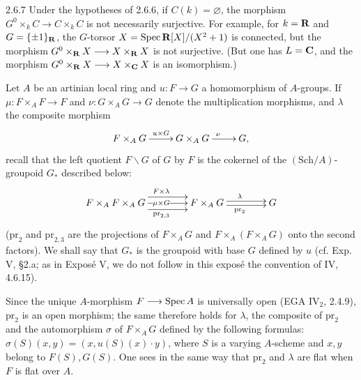 \begin{remark}{2.6.7}\label{VIA.2.6.7}
Under the hypotheses of 2.6.6, if $C(k)=\varnothing$, the morphism $G^0\times_kC\to C\times_kC$ is not necessarily surjective. For example, for $k=\mathbf{R}$ and $G=\{\pm1\}_{\mathbf{R}}$, the $G$-torsor $X=\operatorname{Spec}\mathbf{R}[X]/(X^2+1)$ is connected, but the morphism $G^0\times_{\mathbf{R}}X\longrightarrow X\times_{\mathbf{R}}X$ is not surjective. (But one has $L=\mathbf{C}$, and the morphism $G^0\times_{\mathbf{R}}X\longrightarrow X\times_{\mathbf{C}}X$ is an isomorphism.)
\end{remark}

Let $A$ be an artinian local ring and $u:F\to G$ a homomorphism of $A$-groups. If $\mu:F\times_AF\to F$ and $\nu:G\times_AG\to G$ denote the multiplication morphisms, and $\lambda$ the composite morphism
\[
\xymatrix{F\times_AG\ar[r]^{u\times G}&G\times_AG\ar[r]^\nu&G,}
\]
recall that the left quotient $F\backslash G$ of $G$ by $F$ is the cokernel of the $(\mathrm{Sch}/A)$-groupoid $G_*$ described below:
\[
\xymatrix@C=4em{F\times_AF\times_AG\ar@<1.5ex>[r]^{F\times\lambda}\ar[r]|{\mu\times G}\ar@<-1.5ex>[r]_{\mathrm{pr}_{2,3}}&F\times_AG\ar@<.5ex>[r]^\lambda\ar@<-.5ex>[r]_{\mathrm{pr}_2}&G}
\]
($\mathrm{pr}_2$ and $\mathrm{pr}_{2,3}$ are the projections of $F\times_AG$ and $F\times_A(F\times_AG)$ onto the second factors). We shall say that $G_*$ is the groupoid with base $G$ defined by $u$ (cf. Exp. V, §2.a; as in Exposé V, we do not follow in this exposé the convention of IV, 4.6.15).

Since the unique $A$-morphism $F\longrightarrow\operatorname{Spec} A$ is universally open (EGA IV$_2$, 2.4.9), $\mathrm{pr}_2$ is an open morphism; the same therefore holds for $\lambda$, the composite of $\mathrm{pr}_2$ and the automorphism $\sigma$ of $F\times_AG$ defined by the following formulas: $\sigma(S)(x,y)=(x,u(S)(x)\cdot y)$, where $S$ is a varying $A$-scheme and $x,y$ belong to $F(S),G(S)$. One sees in the same way that $\mathrm{pr}_2$ and $\lambda$ are flat when $F$ is flat over $A$.

